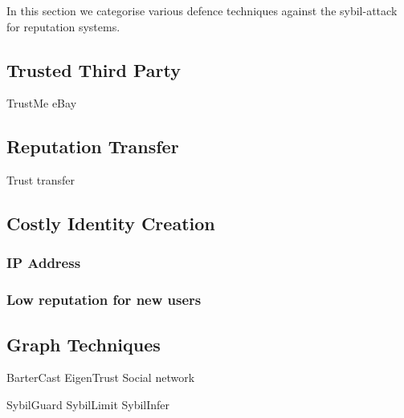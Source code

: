 In this section we categorise various defence techniques against the
sybil-attack for reputation systems.

\subsection{Trusted Third Party}\label{sec:trusted_party}
TrustMe\cite{singh2003trustme}
eBay

\subsection{Reputation Transfer}
Trust transfer\cite{seigneur2005trust}

\subsection{Costly Identity Creation}\label{sec:costly_id}
\subsubsection{IP Address}
\subsubsection{Low reputation for new users}

\subsection{Graph Techniques}\label{sec:graph}
BarterCast\cite{meulpolder2009bartercast}
EigenTrust\cite{kamvar2003eigentrust}
Social network\cite{viswanath2010analysis}

SybilGuard
SybilLimit
SybilInfer


